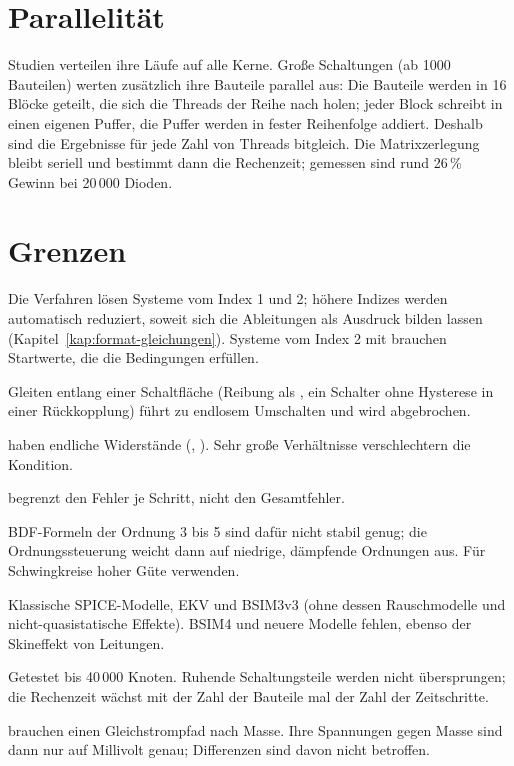 \section{Parallelität}

Studien verteilen ihre Läufe auf alle Kerne. Große Schaltungen (ab 1000
Bauteilen) werten zusätzlich ihre Bauteile parallel aus: Die Bauteile
werden in 16 Blöcke geteilt, die sich die Threads der Reihe nach holen;
jeder Block schreibt in einen eigenen Puffer, die Puffer werden in fester
Reihenfolge addiert. Deshalb sind die Ergebnisse für jede Zahl von Threads
bitgleich. Die Matrixzerlegung bleibt seriell und bestimmt dann die
Rechenzeit; gemessen sind rund 26\,\% Gewinn bei 20\,000 Dioden.

\section{Grenzen}

\begin{description}[style=nextline,leftmargin=2em]
  \item[Index]
    Die Verfahren lösen Systeme vom Index 1 und 2; höhere Indizes werden
    automatisch reduziert, soweit sich die Ableitungen als Ausdruck bilden
    lassen (Kapitel~\ref{kap:format-gleichungen}). Systeme vom Index 2 mit
     brauchen Startwerte, die die Bedingungen erfüllen.
  \item[Ereignisse]
    Gleiten entlang einer Schaltfläche (Reibung als , ein Schalter
    ohne Hysterese in einer Rückkopplung) führt zu endlosem Umschalten und
    wird abgebrochen.
  \item[Schalter und ideale Dioden]
    haben endliche Widerstände (, ). Sehr große
    Verhältnisse  verschlechtern die Kondition.
  \item[Genauigkeit]
     begrenzt den Fehler je Schritt, nicht den Gesamtfehler.
  \item[Schwach gedämpfte Schwingungen]
    BDF-Formeln der Ordnung 3 bis 5 sind dafür nicht stabil genug; die
    Ordnungssteuerung weicht dann auf niedrige, dämpfende Ordnungen aus.
    Für Schwingkreise hoher Güte  verwenden.
  \item[Modelle]
    Klassische SPICE-Modelle, EKV und BSIM3v3 (ohne dessen Rauschmodelle
    und nicht-quasistatische Effekte). BSIM4 und neuere Modelle fehlen,
    ebenso der Skineffekt von Leitungen.
  \item[Große Schaltungen]
    Getestet bis 40\,000 Knoten. Ruhende Schaltungsteile werden nicht
    übersprungen; die Rechenzeit wächst mit der Zahl der Bauteile mal der
    Zahl der Zeitschritte.
  \item[Potentialfreie Schaltungsteile]
    brauchen einen Gleichstrompfad nach Masse. Ihre Spannungen gegen Masse
    sind dann nur auf Millivolt genau; Differenzen sind davon nicht
    betroffen.
\end{description}

